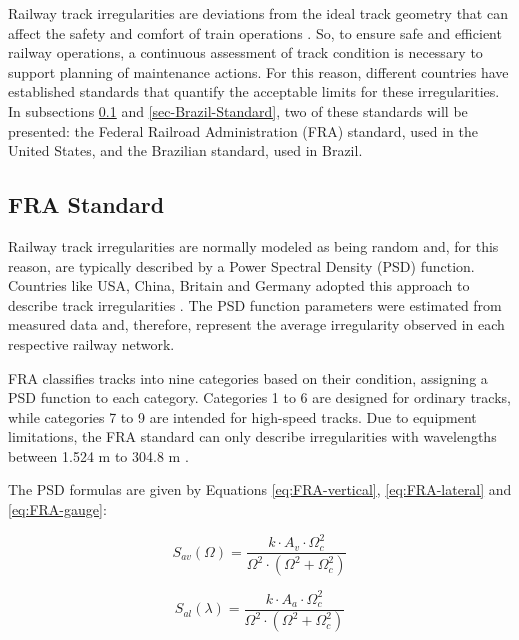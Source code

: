 Railway track irregularities are deviations from the ideal track geometry that can affect the safety and comfort of train operations \cite{Sansinena26032025}. So, to ensure safe and efficient railway operations, a continuous assessment of track condition is necessary to support planning of maintenance actions. For this reason, different countries have established standards that quantify the acceptable limits for these irregularities. In subsections \ref{sec-FRA-Standard} and \ref{sec-Brazil-Standard}, two of these standards will be presented: the Federal Railroad Administration (FRA) standard, used in the United States, and the Brazilian standard, used in Brazil.

\subsection{FRA Standard} \label{sec-FRA-Standard}

Railway track irregularities are normally modeled as being random and, for this reason, are typically described by a Power Spectral Density (PSD) function. Countries like USA, China, Britain and Germany adopted this approach to describe track irregularities \cite{PIRES2021107806,Berawi2013ImprovingRT}. The PSD function parameters were estimated from measured data and, therefore, represent the average irregularity observed in each respective railway network.

FRA classifies tracks into nine categories based on their condition, assigning a PSD function to each category. Categories 1 to 6 are designed for ordinary tracks, while categories 7 to 9 are intended for high-speed tracks. Due to equipment limitations, the FRA standard can only describe irregularities with wavelengths between 1.524 m to 304.8 m \cite{Berawi2013ImprovingRT}.

The PSD formulas are given by Equations \ref{eq:FRA-vertical}, \ref{eq:FRA-lateral} and \ref{eq:FRA-gauge}:

\begin{equation}
    S_{av}(\Omega) = \frac{k \cdot A_v \cdot \Omega_c^2}{\Omega^2 \cdot \left(\Omega^2 + \Omega_c^2\right)}
    \label{eq:FRA-vertical}
\end{equation}

\begin{equation}
    S_{al}(\lambda) = \frac{k \cdot A_a \cdot \Omega_c^2}{\Omega^2 \cdot \left(\Omega^2 + \Omega_c^2\right)}
    \label{eq:FRA-lateral}
\end{equation}

